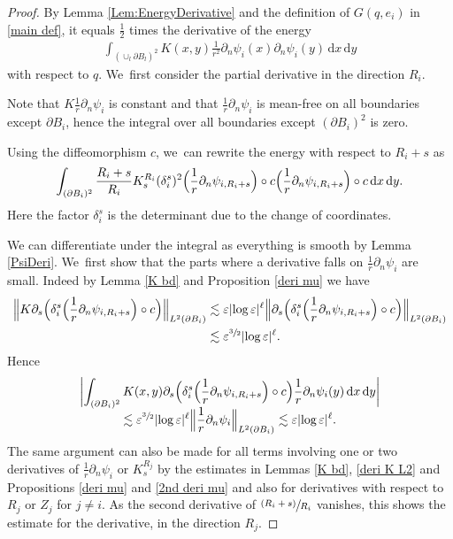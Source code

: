 \documentclass[JEP,XML,SOM,Unicode,published]{cedram}
\let\epsilon\varepsilon
\newcommand{\psfrac}[2]{\sfrac{(#1)}{#2}}
\theoremstyle{definition}
\newcommand\Bnorm[1]{\Bigl\lVert #1\Bigr\rVert}
\newcommand\dd{\,\mathrm{d}}
\newcommand\dx{\dd x}
\newcommand\dy{\dd y}
\let\de\partial
\let\eps\epsilon
\begin{document}
\begin{proof}
By Lemma \ref{Lem:EnergyDerivative} and the definition of $G(q,e_i)$ in \ref{main def}, it equals $\frac{1}{2}$ times the derivative of the energy
\begin{align*}
\int_{(\cup_l \de B_l)^2}K(x,y)\frac{1}{r^2}\de_n\psi_i(x)\de_n\psi_i(y)\dx\dy
\end{align*}
with respect to $q$. We~first consider the partial derivative in the direction $R_i$.

Note that $K\frac{1}{r}\de_n\psi_i$ is constant and that $\frac{1}{r}\de_n\psi_i$ is mean-free on all boundaries except $\de B_i$, hence the integral over all boundaries except $(\de B_i)^2$ is zero.

Using the diffeomorphism $c$, we~can rewrite the energy with respect to $R_i+s$ as
\begin{align*}
\int_{(\de B_i)^2}\frac{R_i+s}{R_i}K_s^{R_i}(\delta_i^s)^2\Bigl(\frac{1}{r}\de_n\psi_{i,R_i+s}\Bigr)\circ c\Bigl(\frac{1}{r}\de_n\psi_{i,R_i+s}\Bigr)\circ c\dx\dy.
\end{align*}
Here the factor $\delta_i^s$ is the determinant due to the change of coordinates.

We can differentiate under the integral as everything is smooth by Lemma \ref{PsiDeri}. We~first show that the parts where a derivative falls on $\frac{1}{r}\de_n\psi_i$ are small. Indeed by Lemma \ref{K bd} and Proposition \ref{deri mu} we have
\begin{align*}
\Bnorm{K\de_s\Bigl(\delta_i^s\Bigl(\frac{1}{r}\de_n\psi_{i,R_i+s}\Bigr)\circ c\Bigr)}_{L^2(\de B_i)}&\lesssim \eps|{\log\eps}|^\ell \Bnorm{\de_s\Bigl(\delta_i^s\Bigl(\frac{1}{r}\de_n\psi_{i,R_i+s}\Bigr)\circ c\Bigr)}_{L^2(\de B_i)}\\
&\lesssim \eps^{\sfrac{3}{2}}|{\log\eps}|^\ell.
\end{align*}
Hence
\begin{multline*}
\biggl|\int_{(\de B_i)^2}K(x,y)\de_s\Bigl(\delta_i^s\Bigl(\frac{1}{r}\de_n\psi_{i,R_i+s}\Bigr)\circ c\Bigr)\frac{1}{r}\de_n\psi_i(y)\dx\dy\biggr|\\[-5pt]
\lesssim \eps^{\sfrac{3}{2}}|{\log\eps}|^\ell\Bnorm{\frac{1}{r}\de_n\psi_i}_{L^2(\de B_i)}
\lesssim \eps|{\log\eps}|^\ell.
\end{multline*}
The same argument can also be made for all terms involving one or two derivatives of $\frac{1}{r}\de_n\psi_i$ or $K_s^{R_j}$ by the estimates in Lemmas \ref{K bd}, \ref{deri K L2} and Propositions \ref{deri mu} and \ref{2nd deri mu} and also for derivatives with respect to $R_j$ or $Z_j$ for $j\neq i$. As the second derivative of $\psfrac{R_i+s}{R_i}$ vanishes, this shows the estimate for the derivative, in the direction $R_j$.


\end{proof}
\end{document}
